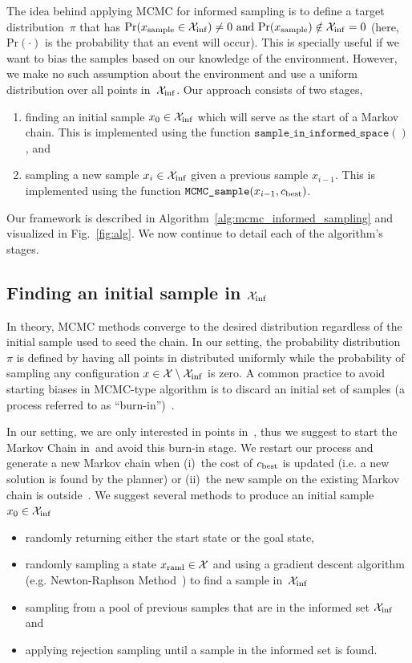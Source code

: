 \documentclass[letterpaper, 10 pt, conference]{ieeeconf}  %
\begin{document}
The idea behind applying MCMC for informed sampling is to define a target distribution~$ \pi $ that has $\text{Pr}(x_{\text{sample}}\in\mathcal{X}_{\rm {inf}}) \ne 0 \text{ and } \text{Pr}(x_{\text{sample}})\notin\mathcal{X}_{\rm {inf}} = 0$ (here, $\text{Pr}(\cdot)$ is the probability that an event will occur). 
This is specially useful if we want to bias the samples based on our knowledge of the environment.
However, we make no such assumption about the environment and use a uniform distribution over all points in~$ \mathcal{X}_{\rm {inf}} $. 
Our approach consists of two stages,
\begin{enumerate}
	\item finding an initial sample $ x_0 \in \mathcal{X}_{\rm {inf}} $ which will serve as the start of a Markov chain. 
	This is implemented using the function 
	$ \texttt{sample\_in\_informed\_space}( )$, and
	\item sampling a new sample $ x_i \in \mathcal{X}_{\rm {inf}} $ given a previous sample $ x_{i-1} $. 
	This is implemented using the function $\texttt{MCMC\_sample} (x_{i-1}, c_{\rm best})$.
\end{enumerate}
Our framework is described in Algorithm~\ref{alg:mcmc_informed_sampling} and visualized in Fig.~\ref{fig:alg}.
We now continue to detail each of the algorithm's stages.

\subsection{Finding an initial sample in $\mathcal{X}_{\rm {inf}}$}
In theory, MCMC methods converge to the desired distribution regardless of the initial sample used to seed the chain.
In our setting, the probability distribution~ $ \pi $ is defined by having all points in \Cinf distributed uniformly
while 
the probability of sampling any configuration $x \in \mathcal{X} \setminus \mathcal{X}_{\rm {inf}}$ is zero.
A common practice to avoid starting biases in MCMC-type algorithm is to discard an initial set of samples (a process referred to as ``burn-in'')~\cite{ADDJ03}. 

In our setting, we are only interested in points in~\Cinf, thus we suggest to start the Markov Chain in~\Cinf and avoid this burn-in stage. 
We restart our process and generate a new Markov chain  when 
(i)~the cost of $c_{\rm best}$ is updated (i.e. a new solution is found by the planner) or
(ii)~the new sample on the existing Markov chain is outside~\Cinf.
We suggest several methods to produce an initial sample~$x_0 \in \mathcal{X}_{\rm {inf}} $ 
\begin{itemize}
	\item randomly returning either the start state or the goal state,
	\item randomly sampling a state $x_{\text {rand}} \in \mathcal{X}$ and using a gradient descent algorithm (e.g. Newton-Raphson Method~\cite{RT06}) to find a sample in~$ \mathcal{X}_{\rm {inf}} $
	\item sampling from a pool of previous samples that are in the informed set $ \mathcal{X}_{\rm {inf}} $ and
	\item applying rejection sampling until a sample in the informed set is found.
\end{itemize}
\end{document}
